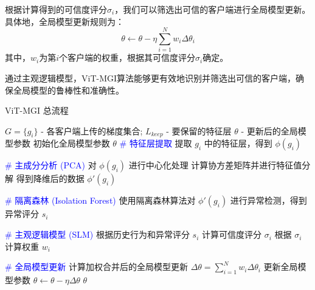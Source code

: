 \documentclass[conference]{IEEEtran}
\begin{document}
根据计算得到的可信度评分$\sigma_i$，我们可以筛选出可信的客户端进行全局模型更新。具体地，全局模型更新规则为：
\[
\theta \leftarrow \theta - \eta \sum_{i=1}^N w_i \Delta \theta_i
\]
其中，$w_i$为第$i$个客户端的权重，根据其可信度评分$\sigma_i$确定。

通过主观逻辑模型，ViT-MGI算法能够更有效地识别并筛选出可信的客户端，确保全局模型的鲁棒性和准确性。

\begin{algorithm}
    \caption{ViT-MGI 总流程}
    \label{alg:vit_mgi}
    \begin{algorithmic}[1]
        \Require $G = \{g_i\}$ - 各客户端上传的梯度集合; $L_{keep}$ - 要保留的特征层
        \Ensure $\theta$ - 更新后的全局模型参数
            \State 初始化全局模型参数 $\theta$
                \State \textcolor{blue}{\# 特征层提取}
                    \State 提取 $g_i$ 中的特征层，得到 $\phi(g_i)$
                \EndFor
                
                \State \textcolor{blue}{\# 主成分分析 (PCA)}
                    \State 对 $\phi(g_i)$ 进行中心化处理
                    \State 计算协方差矩阵并进行特征值分解
                    \State 得到降维后的数据 $\phi'(g_i)$
                \EndFor
                
                \State \textcolor{blue}{\# 隔离森林 (Isolation Forest)}
                    \State 使用隔离森林算法对 $\phi'(g_i)$ 进行异常检测，得到异常评分 $s_i$
                \EndFor
                
                \State \textcolor{blue}{\# 主观逻辑模型 (SLM)}
                    \State 根据历史行为和异常评分 $s_i$ 计算可信度评分 $\sigma_i$
                    \State 根据 $\sigma_i$ 计算权重 $w_i$
                \EndFor
                
                \State \textcolor{blue}{\# 全局模型更新}
                \State 计算加权合并后的全局模型更新 $\Delta \theta = \sum_{i=1}^N w_i \Delta \theta_i$
                \State 更新全局模型参数 $\theta \leftarrow \theta - \eta \Delta \theta$
            \EndFor
        \EndFunction
        \State \Return $\theta$
    \end{algorithmic}
\end{algorithm}
\end{document}
